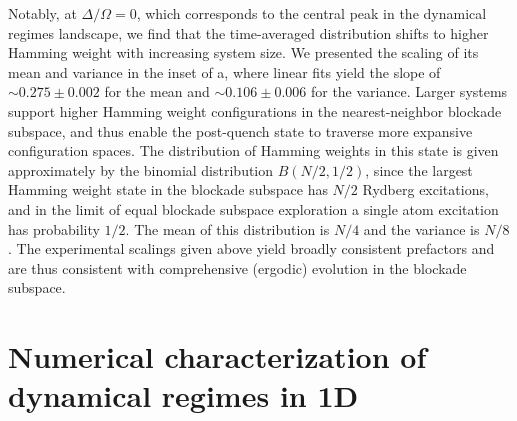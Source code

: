\documentclass[english,floatfix,twocolumn,showpacs, aps, prx, reprint, superscriptaddress, longbibliography]{revtex4-2}
\begin{document}
Notably, at $\Delta / \Omega = 0$, which corresponds to the central peak in the dynamical regimes landscape, we find that the time-averaged distribution shifts to higher Hamming weight with increasing system size. We presented the scaling of its mean and variance in the inset of a, where linear fits yield the slope of $\sim 0.275 \pm 0.002$ for the mean and $\sim 0.106 \pm 0.006$ for the variance. Larger systems support higher Hamming weight configurations in the nearest-neighbor blockade subspace, and thus enable the post-quench state to traverse more expansive configuration spaces. The distribution of Hamming weights in this state is given approximately by the binomial distribution $B \left( N/2 , 1/2 \right)$, since the largest Hamming weight state in the blockade subspace has $N/2$ Rydberg excitations, and in the limit of equal blockade subspace exploration a single atom excitation has probability $1/2$. The mean of this distribution is $N/4$ and the variance is $N/8$. The experimental scalings given above yield broadly consistent prefactors and are thus consistent with comprehensive (ergodic) evolution in the blockade subspace. 



\section{Numerical characterization of dynamical regimes in 1D} 
\label{supp:sec:DPTs_1D_num}
\end{document}

